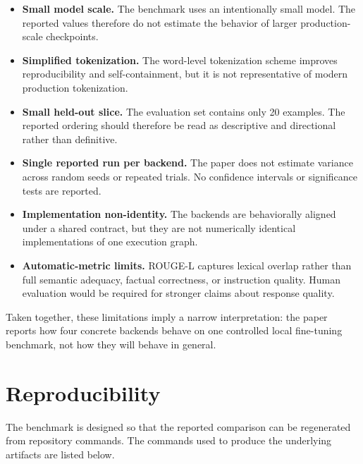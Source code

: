 \documentclass[11pt]{article}
\begin{document}
\begin{itemize}
    \item \textbf{Small model scale.} The benchmark uses an intentionally small model. The reported values therefore do not estimate the behavior of larger production-scale checkpoints.
    \item \textbf{Simplified tokenization.} The word-level tokenization scheme improves reproducibility and self-containment, but it is not representative of modern production tokenization.
    \item \textbf{Small held-out slice.} The evaluation set contains only 20 examples. The reported ordering should therefore be read as descriptive and directional rather than definitive.
    \item \textbf{Single reported run per backend.} The paper does not estimate variance across random seeds or repeated trials. No confidence intervals or significance tests are reported.
    \item \textbf{Implementation non-identity.} The backends are behaviorally aligned under a shared contract, but they are not numerically identical implementations of one execution graph.
    \item \textbf{Automatic-metric limits.} ROUGE-L captures lexical overlap rather than full semantic adequacy, factual correctness, or instruction quality. Human evaluation would be required for stronger claims about response quality.
\end{itemize}

Taken together, these limitations imply a narrow interpretation: the paper reports how four concrete backends behave on one controlled local fine-tuning benchmark, not how they will behave in general.

\section{Reproducibility}

The benchmark is designed so that the reported comparison can be regenerated from repository commands. The commands used to produce the underlying artifacts are listed below.
\end{document}
